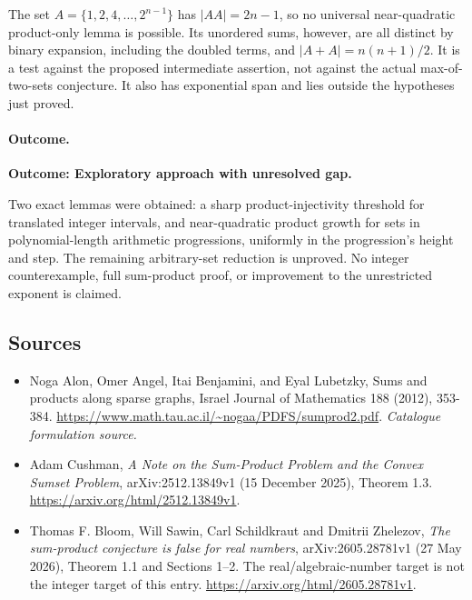 \documentclass[11pt,a4paper]{article}
\numberwithin{equation}{section}
\begin{document}
The set $A=\{1,2,4,\ldots,2^{n-1}\}$ has $|AA|=2n-1$, so no universal
near-quadratic product-only lemma is possible. Its unordered sums, however,
are all distinct by binary expansion, including the doubled terms, and
$|A+A|=n(n+1)/2$. It is a test against the proposed intermediate assertion,
not against the actual max-of-two-sets conjecture. It also has exponential
span and lies outside the hypotheses just proved.

\paragraph{Outcome.}
\textbf{Outcome: Exploratory approach with unresolved gap.}

Two exact lemmas were obtained: a sharp product-injectivity threshold for
translated integer intervals, and near-quadratic product growth for sets
in polynomial-length arithmetic progressions, uniformly in the progression's
height and step. The remaining arbitrary-set reduction is unproved.
No integer counterexample, full sum-product proof, or improvement to the
unrestricted exponent is claimed.
\subsection{Sources}
\begin{itemize}\raggedright
\item[\textnormal{[S1]}]\hypertarget{source:1904:1}{} Noga Alon, Omer Angel, Itai Benjamini, and Eyal Lubetzky, Sums and products along sparse graphs, Israel Journal of Mathematics 188 (2012), 353-384.
\url{https://www.math.tau.ac.il/~nogaa/PDFS/sumprod2.pdf}.
{\small\textit{Catalogue formulation source.}}
\item[\textnormal{[E1]}]\hypertarget{extra:1904:1}{} Adam Cushman,
\emph{A Note on the Sum-Product Problem and the Convex Sumset Problem},
arXiv:2512.13849v1 (15 December 2025), Theorem 1.3.
\url{https://arxiv.org/html/2512.13849v1}.
\item[\textnormal{[E2]}]\hypertarget{extra:1904:2}{} Thomas F. Bloom, Will Sawin,
Carl Schildkraut and Dmitrii Zhelezov,
\emph{The sum-product conjecture is false for real numbers},
arXiv:2605.28781v1 (27 May 2026), Theorem 1.1 and Sections 1--2.
The real/algebraic-number target is not the integer target of this entry.
\url{https://arxiv.org/html/2605.28781v1}.
\end{itemize}
\end{document}
